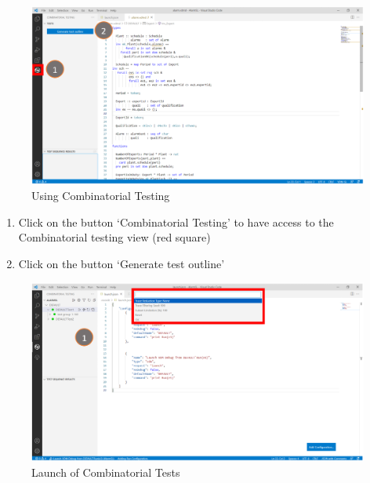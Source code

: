 \documentclass{overturerepchap}
\begin{document}
\begin{figure}[htbp]
\begin{center}
\includegraphics[width=6.5in]{snapshots/Combinatorial testing.PNG}
\caption{Using Combinatorial Testing\label{fig:tracesalarm}}
\end{center}
\end{figure}

\newpage
\begin{enumerate}
    \item Click on the button ‘Combinatorial Testing’ to have access to the Combinatorial testing view (red square)
    \item Click on the button ‘Generate test outline’
\end{enumerate}


\begin{figure}[htbp]
\begin{center}
\includegraphics[width=6.5in]{snapshots/Launch of the combinatorial tests.PNG}
\caption{Launch of Combinatorial Tests\label{fig:SendToInterpreter}}
\end{center}
\end{figure}
\end{document}
